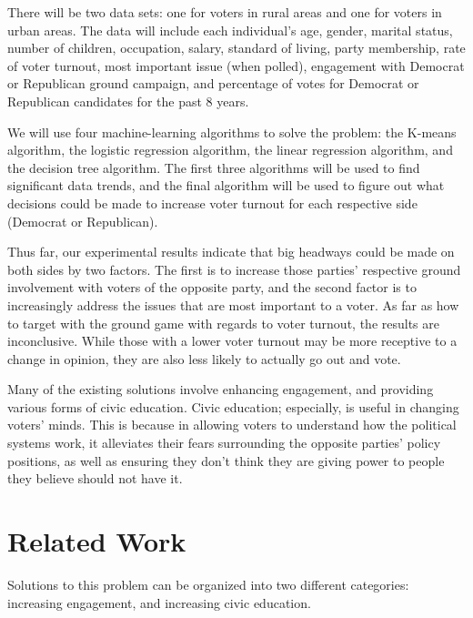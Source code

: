 \documentclass[conference]{IEEEtran}
\begin{document}
There will be two data sets: one for voters in rural areas and one for voters in urban areas. The data will include each individual’s
age, gender, marital status, number of children, occupation, salary, standard of living, party membership, rate of voter turnout, 
most important issue (when polled), engagement with Democrat or Republican ground campaign, and percentage of votes for Democrat or 
Republican candidates for the past 8 years.

We will use four machine-learning algorithms to solve the problem: the K-means algorithm, the logistic regression algorithm, the 
linear regression algorithm, and the decision tree algorithm. The first three algorithms will be used to find significant data 
trends, and the final algorithm will be used to figure out what decisions could be made to increase voter turnout for each respective
side (Democrat or Republican).

Thus far, our experimental results indicate that big headways could be made on both sides by two factors. The first is to increase 
those parties' respective ground involvement with voters of the opposite party, and the second factor is to increasingly address
the issues that are most important to a voter. As far as how to target with the ground game with regards to voter turnout, the 
results are inconclusive. While those with a lower voter turnout may be more receptive to a change in opinion, they are also less 
likely to actually go out and vote.

Many of the existing solutions involve enhancing engagement, and providing various forms of civic education. Civic education; 
especially, is useful in changing voters' minds. This is because in allowing voters to understand how the political systems work,
it alleviates their fears surrounding the opposite parties' policy positions, as well as ensuring they don't think they are giving
power to people they believe should not have it.

\section{Related Work}
Solutions to this problem can be organized into two different categories: increasing engagement, and increasing civic education.
\end{document}
